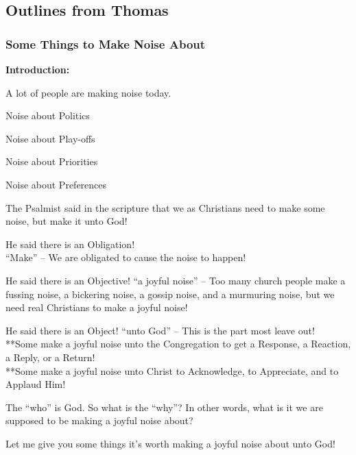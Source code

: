 \subsection{Outlines from Thomas}

\subsubsection{Some Things to Make Noise About}

\textbf{Introduction:} 
\begin{compactenum}
    \item A lot of people are making noise today.
    \begin{compactenum}[a.]
        \item Noise about Politics
        \item Noise about Play-offs
        \item Noise about Priorities
        \item Noise about Preferences
    \end{compactenum}
    \item The Psalmist said in the scripture that we as Christians need to make some noise, but make it unto God!
    \begin{compactenum}[a.]
        \item He said there is an Obligation! \\
        “Make” – We are obligated to cause the noise to happen!
        \item He said there is an Objective!
“a joyful noise” – Too many church people make a fussing noise, a bickering noise, a gossip noise, and a murmuring noise, but we need real Christians to make a joyful noise!
        \item He said there is an Object!
“unto God” – This is the part most leave out! \\
**Some make a joyful noise unto the Congregation to get a Response,  a Reaction, a Reply, or a Return! \\
**Some make a joyful noise unto Christ to Acknowledge, to Appreciate, and to Applaud Him!
    \end{compactenum}
    \item The “who” is God.  So what is the “why”?  In other words, what is it we are supposed to be making a joyful noise about?    
    \item Let me give you some things it’s worth making a joyful noise about unto God! \\
\end{compactenum}


